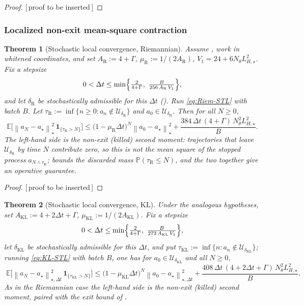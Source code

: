 \documentclass[11pt]{article}
\theoremstyle{plain}
\newtheorem{theorem}{Theorem}[section]
\theoremstyle{definition}
\theoremstyle{remark}
\newcommand{\E}{\mathbb{E}}
\newcommand{\Prob}{\mathbb{P}}
\newcommand{\KL}{\mathrm{KL}}
\newcommand{\Riem}{\mathrm{R}}
\newcommand{\norm}[1]{\left\lVert #1\right\rVert}
\newcommand{\Ureg}{\mathcal{U}}
\newcommand{\LHs}{L_{H,\star}}
\newcommand{\PROOFHOLE}{{\color{red}\textsf{[\,proof to be inserted\,]}}}
\begin{document}
\begin{proof}
\PROOFHOLE
\end{proof}

\subsubsection{Localized non-exit mean-square contraction}
\label{subsec:local-contraction}

\begin{theorem}[Stochastic local convergence, Riemannian]
\label{thm:stoch-local-Riem}
Assume , work in whitened coordinates, and set
$A_{\Riem}:=4+\Gamma$, $\mu_{\Riem}:=1/(2A_{\Riem})$, $V_1=24+6N_\theta\LHs^2$. Fix a stepsize
\[
    0<\Delta t\leq\min\Bigl\{\tfrac{2}{4+\Gamma},\ \tfrac{B}{256\,A_{\Riem}\,V_1}\Bigr\},
\]
and let $\delta_{\Riem}$ be stochastically admissible for this $\Delta t$ ().
Run \eqref{eq:Riem-STL} with batch $B$.
Let $\tau_{\Riem}:=\inf\{n\geq0:a_n\notin\Ureg_{\delta_{\Riem}}\}$ and $a_0\in\Ureg_{\delta_{\Riem}}$.
Then for all $N\geq0$,
\[
    \boxed{\;
    \E\bigl[\norm{a_N-a_\star}_\star^2\,\mathbf 1_{\{\tau_{\Riem}>N\}}\bigr]
    \leq\bigl(1-\mu_{\Riem}\Delta t\bigr)^N\norm{a_0-a_\star}_\star^2
    +\frac{384\,\Delta t\,(4+\Gamma)\,N_\theta^2\LHs^2}{B}.
    \;}
\]
The left-hand side is the \emph{non-exit} (killed) second moment: trajectories that leave
$\Ureg_{\delta_{\Riem}}$ by time $N$ contribute zero, so this is not the mean square of the stopped
process $a_{N\wedge\tau_{\Riem}}$;  bounds the discarded mass
$\Prob(\tau_{\Riem}\leq N)$, and the two together give an operative guarantee.
\end{theorem}

\begin{proof}
\PROOFHOLE
\end{proof}

\begin{theorem}[Stochastic local convergence, KL]
\label{thm:stoch-local-KL}
Under the analogous hypotheses, set $A_{\KL}:=4+2\Delta t+\Gamma$, $\mu_{\KL}:=1/(2A_{\KL})$. Fix a
stepsize
\[
    0<\Delta t\leq\min\Bigl\{\tfrac2{4+\Gamma},\ \tfrac{B}{272\,A_{\KL}\,V_1}\Bigr\},
\]
let $\delta_{\KL}$ be stochastically admissible for this $\Delta t$, and put $\tau_{\KL}:=\inf\{n:a_n\notin\Ureg_{\delta_{\KL}}\}$;
running \eqref{eq:KL-STL} with batch $B$, one has for $a_0\in\Ureg_{\delta_{\KL}}$ and all $N\geq0$,
\[
    \boxed{\;
    \E\bigl[\norm{a_N-a_\star}_{\star,\Delta t}^2\,\mathbf 1_{\{\tau_{\KL}>N\}}\bigr]
    \leq\bigl(1-\mu_{\KL}\Delta t\bigr)^N\norm{a_0-a_\star}_{\star,\Delta t}^2
    +\frac{408\,\Delta t\,(4+2\Delta t+\Gamma)\,N_\theta^2\LHs^2}{B}.
    \;}
\]
As in the Riemannian case the left-hand side is the non-exit (killed) second moment, paired with the
exit bound of .
\end{theorem}
\end{document}
